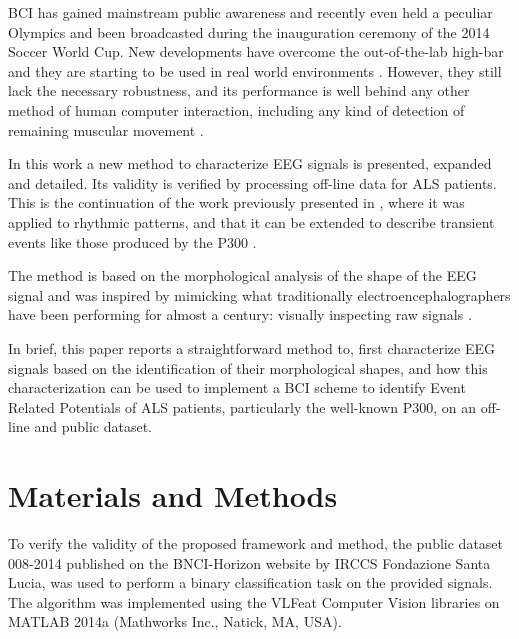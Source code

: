 \documentclass[entropy,article,submit,moreauthors,pdftex,10pt,a4paper]{mdpi}
\begin{document}

BCI has gained mainstream public awareness and recently even held a peculiar Olympics \citep{Riener2014} and been broadcasted during the inauguration ceremony of the 2014 Soccer World Cup.  New developments have overcome the out-of-the-lab high-bar and they are starting to be used in real world environments \citep{Huggins2016}.  However, they still lack the necessary robustness, and its performance is well behind any other method of human computer interaction, including any kind of detection of remaining muscular movement \citep{Clerc}.

In this work a new method to characterize EEG signals is presented, expanded and detailed.  Its validity is verified by processing off-line data for ALS patients.  This is the continuation of the work previously presented in \citep{Ramele2016}, where it was applied to rhythmic patterns, and that it can be extended to describe transient events like those produced by the P300 \citep{Knuth2006}.

The method is based on the morphological analysis of the shape of the EEG signal \citep{Alvarado-Gonzalez2016,Yamaguchi2009} and was inspired by mimicking what traditionally electroencephalographers have been performing for almost a century: visually inspecting  raw signals \citep{Hartman2005}.

In brief, this paper reports a straightforward method to, first characterize EEG signals based on the identification of their morphological shapes, and how this characterization can be used to implement a BCI scheme to identify Event Related Potentials of ALS patients, particularly the well-known P300, on an off-line and public dataset.


\section{Materials and Methods}

To verify the validity of the proposed framework and method, the public dataset 008-2014  \citep{Riccio2013} published on the BNCI-Horizon website \citep{Brunner2014} by  IRCCS Fondazione Santa Lucia, was used to perform a binary classification task on the provided signals.  The algorithm was implemented using the VLFeat  \citep{Vedaldi2010} Computer Vision libraries on MATLAB 2014a (Mathworks Inc., Natick, MA, USA). 
\end{document}

